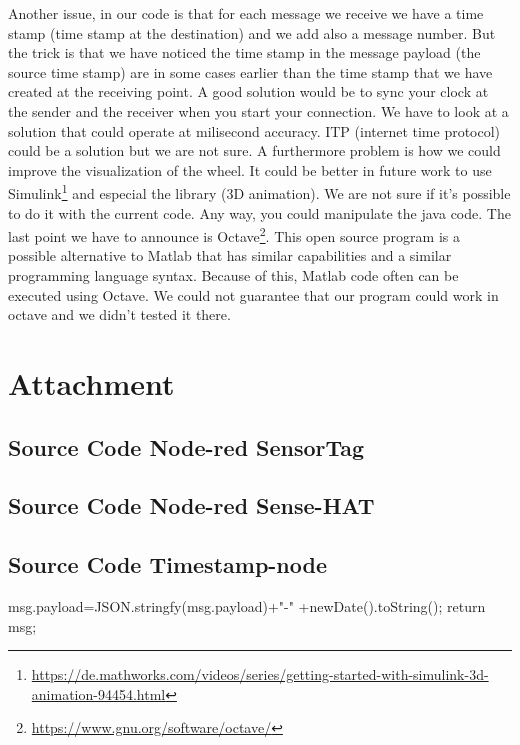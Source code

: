 \documentclass[12pt]{article}
\begin{document}
Another issue, in our code is that for each message we receive we have a time stamp (time stamp at the destination) and we add also a message number. But the trick is that we have noticed the time stamp in the message payload (the source time stamp) are in some cases earlier than the time stamp that we have created at the receiving point.\newline
A good solution would be to sync your clock at the sender and the receiver when you start your connection. We have to look at a solution that could operate at milisecond accuracy. ITP (internet time protocol) could be a solution but we are not sure.\newline
A furthermore problem is how we could improve the visualization of the wheel. It could be better in future work to use Simulink\footnote{\url{https://de.mathworks.com/videos/series/getting-started-with-simulink-3d-animation-94454.html}} and especial the library (3D animation). We are not sure if it's possible to do it with the current code. Any way, you could manipulate the java code.
\newline
The last point we have to announce is Octave\footnote{\url{https://www.gnu.org/software/octave/}}. This open source program is a possible alternative to Matlab that has similar capabilities and a similar programming language syntax. Because of this, Matlab code often can be executed using Octave. We could not guarantee that our program could work in octave and we didn't tested it there. 
\newpage
\section{Attachment}\label{sec:attachment}
\subsection{Source Code Node-red SensorTag}\label{sec:source-code-node-red SensorTag}
 
\subsection{Source Code Node-red Sense-HAT}\label{sec:source-code-node-red Sense-HAT}
 

\subsection{Source Code Timestamp-node}\label{sec:source-code-timesptamp-node}
msg.payload=JSON.stringfy(msg.payload)+"-" +newDate().toString();\newline
return msg;
\end{document}
